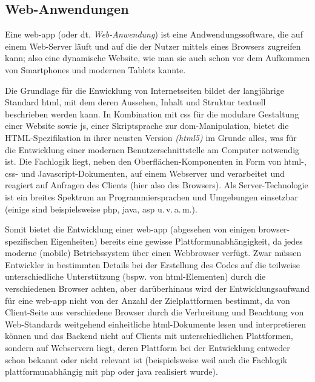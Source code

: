 \subsection{Web-Anwendungen}

Eine \gls{web-app} (oder dt. \emph{Web-Anwendung}) ist eine Andwendungssoftware, die auf einem Web-Server läuft und auf die der Nutzer mittels eines Browsers zugreifen kann; also eine dynamische Website, wie man sie auch schon vor dem Aufkommen von Smartphones und modernen Tablets kannte. 

Die Grundlage für die Enwicklung von Internetseiten bildet der langjährige Standard \gls{html}, mit dem deren Aussehen, Inhalt und Struktur textuell beschrieben werden kann. 
In Kombination mit \gls{css} für die modulare Gestaltung einer Website sowie \gls{js}, einer Skriptsprache zur \gls{dom}-Manipulation, bietet die HTML-Spezifikation in ihrer neusten Version \textsl{(\gls{html5})} im Grunde alles, was für die Entwicklung einer modernen Benutzerschnittstelle am Computer notwendig ist. 
Die Fachlogik liegt, neben den Oberflächen-Komponenten in Form von \mbox{\gls{html}-,} \gls{css}- und Javascript-Dokumenten, auf einem Webserver und verarbeitet und reagiert auf Anfragen des Clients (hier also des Browsers).
Als Server-Technologie ist ein breites Spektrum an Programmiersprachen und Umgebungen einsetzbar (einige sind beispielsweise \gls*{php}, \gls*{java}, \gls*{asp} u.\,v.\,a.\,m.).

Somit bietet die Entwicklung einer \gls{web-app} (abgesehen von einigen browser-spezifischen Eigenheiten) bereits eine gewisse Plattformunabhängigkeit, da jedes moderne (mobile) Betriebssystem über einen Webbrowser verfügt. 
Zwar müssen Entwickler in bestimmten Details bei der Erstellung des Codes auf die teilweise unterschiedliche Unterstützung (bspw. von \gls{html}-Elementen) durch die verschiedenen Browser achten, aber darüberhinaus wird der Entwicklungsaufwand für eine \gls{web-app} nicht von der Anzahl der Zielplattformen bestimmt, da von Client-Seite aus verschiedene Browser durch die Verbreitung und Beachtung von Web-Standards weitgehend einheitliche \gls{html}-Dokumente lesen und interpretieren können und das Backend nicht auf Clients mit unterschiedlichen Plattformen, sondern auf Webservern liegt, deren Plattform bei der Entwicklung entweder schon bekannt oder nicht relevant ist (beispielsweise weil auch die Fachlogik plattformunabhängig mit \gls*{php} oder \gls*{java} realisiert wurde).

